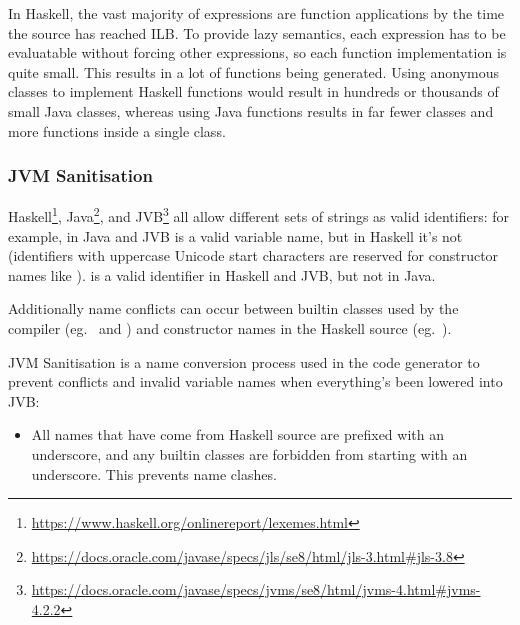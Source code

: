 \documentclass[dissertation.tex]{subfiles}
\begin{document}
{{{{                In Haskell, the vast majority of expressions are function applications by the time the source has
                reached ILB. To provide lazy semantics, each expression has to be evaluatable without forcing other
                expressions, so each function implementation is quite small. This results in a lot of functions being
                generated. Using anonymous classes to implement Haskell functions would result in hundreds or thousands
                of small Java classes, whereas using Java functions results in far fewer classes and more functions
                inside a single class.

            }
        }
        \subsubsection{JVM Sanitisation}
        {

            Haskell\footnote{\url{https://www.haskell.org/onlinereport/lexemes.html}},
            Java\footnote{\url{https://docs.oracle.com/javase/specs/jls/se8/html/jls-3.html\#jls-3.8}}, and
            JVB\footnote{\url{https://docs.oracle.com/javase/specs/jvms/se8/html/jvms-4.html\#jvms-4.2.2}} all allow
            different sets of strings as valid identifiers: for example, in Java and JVB  is a valid variable
            name, but in Haskell it's not (identifiers with uppercase Unicode start characters are reserved for
            constructor names like ). \monospace{+} is a valid identifier in Haskell and JVB, but not in
            Java.

            Additionally name conflicts can occur between builtin classes used by the compiler (eg.\  and
            ) and constructor names in the Haskell source (eg.\ ).

            JVM Sanitisation is a name conversion process used in the code generator to prevent conflicts and invalid
            variable names when everything's been lowered into JVB:

            \begin{itemize}
            \item
            {

                All names that have come from Haskell source are prefixed with an underscore, and any builtin classes
                are forbidden from starting with an underscore. This prevents name clashes.

}
\end{itemize}}}}
\end{document}
